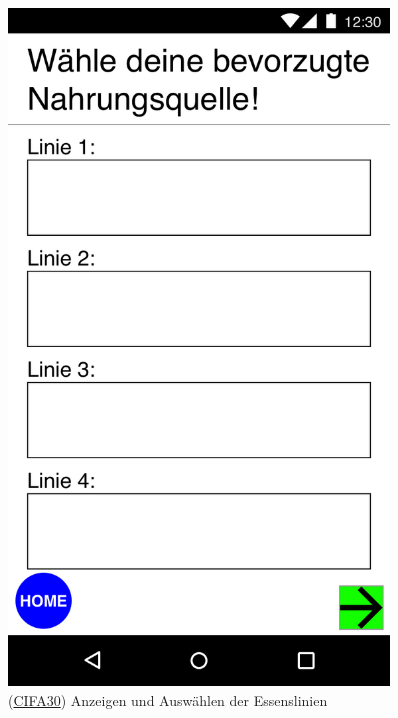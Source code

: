 \documentclass[a4paper]{scrreprt}
\begin{document}
\begin{figure}[H]
\begin{minipage}[b]{0.48\textwidth}
		\includegraphics[width=0.9\textwidth]{res/GUI/04.jpeg}
		\label{Fig.4}
		(\hyperlink{cifa30}{CIFA30}) Anzeigen und Auswählen der Essenslinien
	\end{minipage}
\end{figure}
\end{document}
